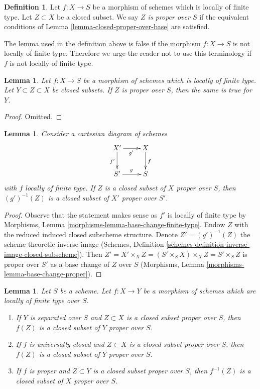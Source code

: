 \documentclass{stacks-project}
\theoremstyle{plain}
\newtheorem{lemma}[subsection]{Lemma}
\theoremstyle{definition}
\newtheorem{definition}[subsection]{Definition}
\theoremstyle{remark}
\numberwithin{equation}{subsection}
\begin{document}
\begin{definition}
\label{definition-proper-over-base}
Let $f : X \to S$ be a morphism of schemes which is locally of finite type.
Let $Z \subset X$ be a closed subset.
We say {\it $Z$ is proper over $S$}
if the equivalent conditions of Lemma \ref{lemma-closed-proper-over-base}
are satisfied.
\end{definition}

\noindent
The lemma used in the definition above is false if the morphism
$f : X \to S$ is not locally of finite type. Therefore we urge
the reader not to use this terminology if $f$ is not locally of
finite type.

\begin{lemma}
\label{lemma-closed-closed-proper-over-base}
Let $f : X \to S$ be a morphism of schemes which is locally of finite type.
Let $Y \subset Z \subset X$ be closed subsets.
If $Z$ is proper over $S$, then the same is true for $Y$.
\end{lemma}

\begin{proof}
Omitted.
\end{proof}

\begin{lemma}
\label{lemma-base-change-closed-proper-over-base}
Consider a cartesian diagram of schemes
$$
\xymatrix{
X' \ar[d]_{f'} \ar[r]_{g'} & X \ar[d]^f \\
S' \ar[r]^g & S
}
$$
with $f$ locally of finite type.
If $Z$ is a closed subset of $X$ proper over $S$, then
$(g')^{-1}(Z)$ is a closed subset of $X'$ proper over $S'$.
\end{lemma}

\begin{proof}
Observe that the statement makes sense as $f'$ is locally of
finite type by Morphisms, Lemma \ref{morphisms-lemma-base-change-finite-type}.
Endow $Z$ with the reduced induced closed subscheme structure.
Denote $Z' = (g')^{-1}(Z)$ the scheme theoretic inverse image
(Schemes, Definition \ref{schemes-definition-inverse-image-closed-subscheme}).
Then $Z' = X' \times_X Z = (S' \times_S X) \times_X Z = S' \times_S Z$
is proper over $S'$ as a base change of $Z$ over $S$
(Morphisms, Lemma \ref{morphisms-lemma-base-change-proper}).
\end{proof}

\begin{lemma}
\label{lemma-functoriality-closed-proper-over-base}
Let $S$ be a scheme. Let $f : X \to Y$ be a morphism of schemes which
are locally of finite type over $S$.
\begin{enumerate}
\item If $Y$ is separated over $S$ and $Z \subset X$ is a closed subset
proper over $S$, then $f(Z)$ is a closed subset of $Y$ proper over $S$.
\item If $f$ is universally closed and $Z \subset X$ is a
closed subset proper over $S$, then $f(Z)$ is a closed subset
of $Y$ proper over $S$.
\item If $f$ is proper and $Z \subset Y$ is a closed subset
proper over $S$, then $f^{-1}(Z)$ is a closed subset of $X$ proper over $S$.
\end{enumerate}
\end{lemma}
\end{document}

